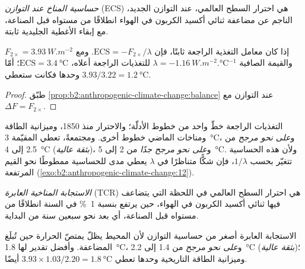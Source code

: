 \begin{definition}\label{def:b2:anthropogenic-climate-change:ecs}
\emph{حساسية المناخ عند التوازن} (ECS) هي احترار السطح
العالمي، عند التوازن الجديد، الناجم عن مضاعفة ثنائي أكسيد الكربون في
الهواء انطلاقًا من مستواه قبل الصناعة، مع إبقاء الأغطية الجليدية ثابتة.
\end{definition}

\begin{proposition}\label{prop:b2:anthropogenic-climate-change:ecs}
إذا كان معامل التغذية الراجعة ثابتًا، فإن $\text{ECS} = -F_{2\times}/\lambda$. ومع $F_{2\times} =
\qty{3.93}{W.m^{-2}}$ والقيمة الصافية $\lambda = \qty{-1.16}{W.m^{-2}.\celsius^{-1}}$ للتغذيات الراجعة
أعلاه، $\text{ECS} = \qty{3.4}{\celsius}$؛ أمّا  وحدها فكانت ستعطي $3.93/3.22 =
\qty{1.2}{\celsius}$.
\end{proposition}
\begin{proof}
طبّق \cref{prop:b2:anthropogenic-climate-change:balance} عند التوازن مع $\Delta F =
F_{2\times}$.
\end{proof}

التغذيات الراجعة خطّ واحد من خطوط الأدلّة؛ والاحترار منذ 1850، وميزانية الطاقة ومناخات
الماضي خطوط أخرى. ومجتمعةً، تعطي  المقيّمة \qty{3}{\celsius}، و\emph{على نحو مرجح}
من 2.5 إلى \qty{4}{\celsius} (\emph{بثقة عالية})، و\emph{على نحو مرجح جدًا} من 2 إلى \qty{5}{\celsius}.
ولأن هذه الحساسية تتغيّر بحسب $1/\lambda$، فإن شكًّا متناظرًا في $\lambda$ يعطي مدى
للحساسية ممطوطًا نحو القيم المرتفعة (\cref{exo:b2:anthropogenic-climate-change:12}).

\begin{definition}\label{def:b2:anthropogenic-climate-change:tcr}
\emph{الاستجابة المناخية العابرة} (TCR) هي احترار السطح
العالمي في اللحظة التي يتضاعف فيها ثنائي أكسيد الكربون في الهواء، حين يرتفع بنسبة \qty{1}{\percent}
في السنة انطلاقًا من مستواه قبل الصناعة، أي بعد نحو سبعين سنة من البداية.
\end{definition}

الاستجابة العابرة أصغر من حساسية التوازن لأن المحيط يظلّ يمتصّ الحرارة حين تُبلَغ
المضاعفة. وأفضل تقدير لها \qty{1.8}{\celsius}، و\emph{على نحو مرجح} من 1.4 إلى \qty{2.2}{\celsius}
(\emph{بثقة عالية})؛ وميزانية الطاقة التاريخية وحدها تعطي $3.93 \times 1.03/2.20 =
\qty{1.8}{\celsius}$ أيضًا.


